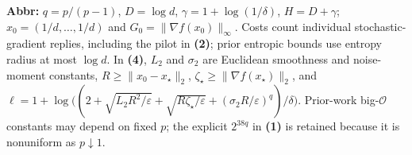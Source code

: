\begin{table}[tp]
\begin{threeparttable}
\begin{tablenotes}[flushleft]
\item[] \textbf{Abbr:} $q=p/(p-1)$, $D=\log d$, $\gamma=1+\log(1/\delta)$, $H=D+\gamma$; $x_0=(1/d,\ldots,1/d)$ and $G_0=\|\nabla f(x_0)\|_\infty$. Costs count individual stochastic-gradient replies, including the pilot in \textbf{(2)}; prior entropic bounds use entropy radius at most $\log d$. In \textbf{(4)}, $L_2$ and $\sigma_2$ are Euclidean smoothness and noise-moment constants, $R\ge\|x_0-x_\star\|_2$, $\zeta_\star\ge\|\nabla f(x_\star)\|_2$, and $\ell=1+\log\!\bigl((2+\sqrt{L_2R^2/\varepsilon}+\sqrt{R\zeta_\star/\varepsilon}+(\sigma_2R/\varepsilon)^q)/\delta\bigr)$. Prior-work big-$\mathcal{O}$ constants may depend on fixed $p$; the explicit $2^{38q}$ in \textbf{(1)} is retained because it is nonuniform as $p\downarrow1$.
\end{tablenotes}
\end{threeparttable}
\end{table}
\clearpage
